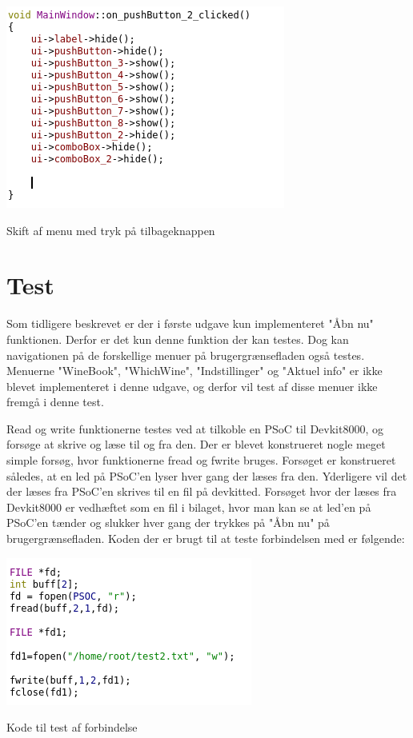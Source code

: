 \includegraphics{Billeder/tilbageKnap}
\caption{Skift af menu med tryk på tilbageknappen}


\section*{Test}

Som tidligere beskrevet er der i første udgave kun implementeret "Åbn nu" funktionen. Derfor er det kun denne funktion der kan testes. Dog kan navigationen på de forskellige menuer på brugergrænsefladen også testes. Menuerne "WineBook", "WhichWine", "Indstillinger" og "Aktuel info" er ikke blevet implementeret i denne udgave, og derfor vil test af disse menuer ikke fremgå i denne test.

Read og write funktionerne testes ved at tilkoble en PSoC til Devkit8000, og forsøge at skrive og læse til og fra den. Der er blevet konstrueret nogle meget simple forsøg, hvor funktionerne fread og fwrite bruges. Forsøget er konstrueret således, at en led på PSoC'en lyser hver gang der læses fra den. Yderligere vil det der læses fra PSoC'en skrives til en fil på devkitted. Forsøget hvor der læses fra Devkit8000 er vedhæftet som en fil i bilaget, hvor man kan se at led'en på PSoC'en tænder og slukker hver gang der trykkes på "Åbn nu" på brugergrænsefladen. Koden der er brugt til at teste forbindelsen med er følgende:

\includegraphics{Billeder/testKode}
\caption{Kode til test af forbindelse}

